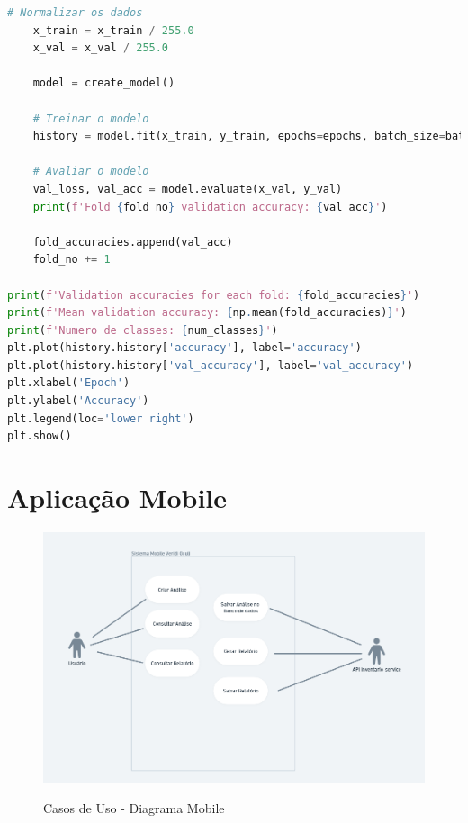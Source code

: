 \documentclass[
  a4paper,%
  12pt,%
  english,%
  brazilian,%
]{article}
\begin{document}
\begin{lstlisting}[language=Python, caption={Treinamento do modelo de aprendizagem profunda}]
    # Normalizar os dados
    x_train = x_train / 255.0
    x_val = x_val / 255.0
    
    model = create_model()
    
    # Treinar o modelo
    history = model.fit(x_train, y_train, epochs=epochs, batch_size=batch_size, validation_data=(x_val, y_val))
    
    # Avaliar o modelo
    val_loss, val_acc = model.evaluate(x_val, y_val)
    print(f'Fold {fold_no} validation accuracy: {val_acc}')
    
    fold_accuracies.append(val_acc)
    fold_no += 1

print(f'Validation accuracies for each fold: {fold_accuracies}')
print(f'Mean validation accuracy: {np.mean(fold_accuracies)}')
print(f'Numero de classes: {num_classes}')
plt.plot(history.history['accuracy'], label='accuracy')
plt.plot(history.history['val_accuracy'], label='val_accuracy')
plt.xlabel('Epoch')
plt.ylabel('Accuracy')
plt.legend(loc='lower right')
plt.show()

\end{lstlisting}


\section*{Aplicação Mobile}

\begin{figure}[H]
    \centering
    \caption{Casos de Uso - Diagrama Mobile}
    \includegraphics[width=.6\textwidth,keepaspectratio]{Logos/caso-de-uso-mobile.png}
    \label{fig:mobile1}
\end{figure}
\end{document}
